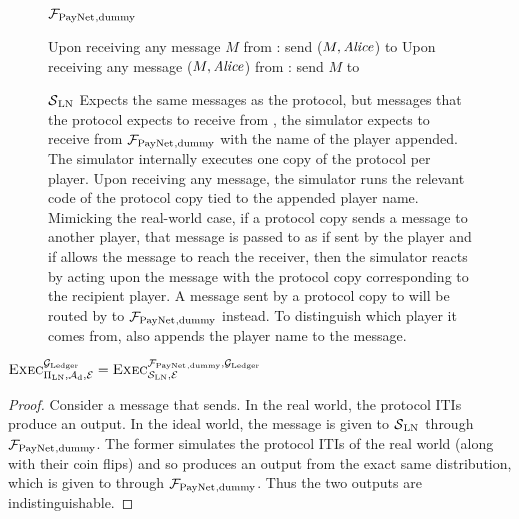 \begin{figure}[!htbp]
\begin{systembox}{$\mathcal{F}_{\mathrm{PayNet}}{}_{\mathrm{, dummy}}$}
  \begin{algorithmic}[1]
    \State Upon receiving any message $M$ from \alice: send ($M, \mathit{Alice}$) to
    \simulator
    \State Upon receiving any message ($M, \mathit{Alice}$) from \simulator: send $M$ to
    \alice
  \end{algorithmic}
\end{systembox}
\caption{}
\label{alg:fpaynet:dummy}
\end{figure}

\begin{figure}[!htbp]
\begin{simulatorbox}{$\mathcal{S}{}_{\mathrm{LN}}$}
  Expects the same messages as the protocol, but messages that the protocol
  expects to receive from \environment, the simulator expects to receive from
  $\mathcal{F}_{\mathrm{PayNet}}{}_{\mathrm{, dummy}}$ with the name of the player appended. The
  simulator internally executes one copy of the protocol per player. Upon
  receiving any message, the simulator runs the relevant code of the protocol
  copy tied to the appended player name. Mimicking the real-world case, if a
  protocol copy sends a message to another player, that message is passed to
  \adversary{} as if sent by the player and if \adversary{} allows the message
  to reach the receiver, then the simulator reacts by acting upon the message
  with the protocol copy corresponding to the recipient player. A message sent
  by a protocol copy to \environment{} will be routed by \simulator{} to
  $\mathcal{F}_{\mathrm{PayNet}}{}_{\mathrm{, dummy}}$ instead. To distinguish which player it comes
  from, \simulator{} also appends the player name to the message.
\end{simulatorbox}
\caption{}
\label{alg:sim:ln}
\end{figure}

\begin{lemma}
  \label{lemma:dummy}
  $\textsc{Exec}^{\mathcal{G}_{\mathrm{Ledger}}}_{\Pi_{\mathrm{LN}}, \mathcal{A}_{\mathrm{d}},
  \mathcal{E}} = \textsc{Exec}^{\mathcal{F}_{\mathrm{PayNet}}{}_{\mathrm{, dummy}},
  \mathcal{G}_{\mathrm{Ledger}}}_{\mathcal{S}_{\mathrm{LN}}, \mathcal{E}}$
\end{lemma}

\begin{proof}
  Consider a message that \environment{} sends. In the real world, the protocol
  ITIs produce an output. In the ideal world, the message is given to
  $\mathcal{S}{}_{\mathrm{LN}}$ through $\mathcal{F}_{\mathrm{PayNet}}{}_{\mathrm{, dummy}}$. The
  former simulates the protocol ITIs of the real world (along with their coin
  flips) and so produces an output from the exact same distribution, which is
  given to \environment{} through $\mathcal{F}_{\mathrm{PayNet}}{}_{\mathrm{, dummy}}$. Thus the two
  outputs are indistinguishable.
\end{proof}

